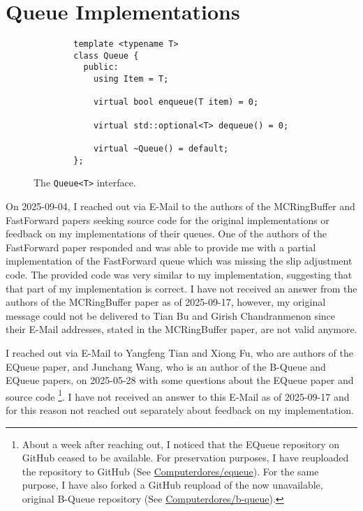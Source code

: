 \section{Queue Implementations}
\begin{figure}
    \begin{verbatim}
        template <typename T>
        class Queue {
          public:
            using Item = T;

            virtual bool enqueue(T item) = 0;

            virtual std::optional<T> dequeue() = 0;

            virtual ~Queue() = default;
        };
    \end{verbatim}
    \caption{The \texttt{Queue<T>} interface.}
    \label{fig:queue-interface}
\end{figure}

On 2025-09-04, I reached out via E-Mail to the authors of the MCRingBuffer and FastForward papers seeking
source code for the original implementations or feedback on my implementations of their queues.
One of the authors of the FastForward paper responded and was able to provide me with a partial
implementation of the FastForward queue which was missing the slip adjustment code.
The provided code was very similar to my implementation, suggesting that that part of my implementation is correct.
I have not received an answer from the authors of the MCRingBuffer paper as of 2025-09-17, however, my
original message could not be delivered to Tian Bu and Girish Chandranmenon since their E-Mail addresses,
stated in the MCRingBuffer paper, are not valid anymore.

I reached out via E-Mail to Yangfeng Tian and Xiong Fu, who are authors of the EQueue paper, and Junchang
Wang, who is an author of the B-Queue and EQueue papers, on 2025-05-28 with some questions about the EQueue
paper and source code
\footnote{About a week after reaching out, I noticed that the EQueue repository on GitHub ceased to be available.
For preservation purposes, I have reuploaded the repository to GitHub (See \href{https://github.com/Computerdores/equeue}{Computerdores/equeue}).
For the same purpose, I have also forked a GitHub reupload of the now unavailable, original B-Queue repository (See \href{https://github.com/Computerdores/b-queue}{Computerdores/b-queue}).}.
I have not received an answer to this E-Mail as of 2025-09-17 and for this reason not reached out separately
about feedback on my implementation.

